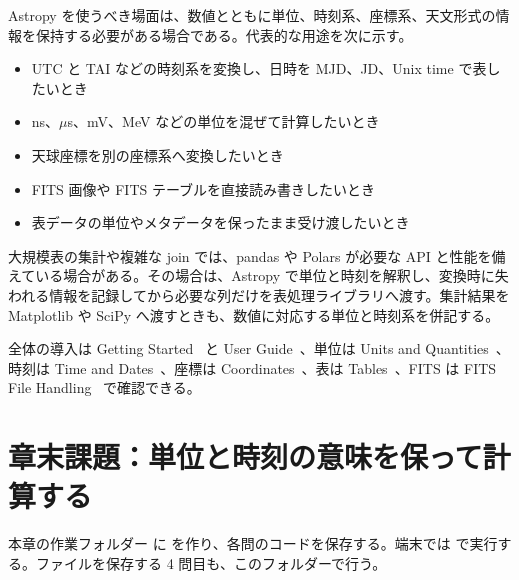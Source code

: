 Astropy を使うべき場面は、数値とともに単位、時刻系、座標系、天文形式の情報を保持する必要がある場合である。代表的な用途を次に示す。

\begin{itemize}
\item UTC と TAI などの時刻系を変換し、日時を MJD、JD、Unix time で表したいとき
\item ns、\(\mu\)s、mV、MeV などの単位を混ぜて計算したいとき
\item 天球座標を別の座標系へ変換したいとき
\item FITS 画像や FITS テーブルを直接読み書きしたいとき
\item 表データの単位やメタデータを保ったまま受け渡したいとき
\end{itemize}

大規模表の集計や複雑な join では、pandas や Polars が必要な API と性能を備えている場合がある。その場合は、Astropy で単位と時刻を解釈し、変換時に失われる情報を記録してから必要な列だけを表処理ライブラリへ渡す。集計結果を Matplotlib や SciPy へ渡すときも、数値に対応する単位と時刻系を併記する。

全体の導入は Getting Started~\cite{astropy_getting_started} と User Guide~\cite{astropy_user_guide}、単位は Units and Quantities~\cite{astropy_units}、時刻は Time and Dates~\cite{astropy_time}、座標は Coordinates~\cite{astropy_coordinates}、表は Tables~\cite{astropy_table}、FITS は FITS File Handling~\cite{astropy_fits} で確認できる。

\section{章末課題：単位と時刻の意味を保って計算する}

本章の作業フォルダー  に  を作り、各問のコードを保存する。端末では  で実行する。ファイルを保存する 4 問目も、このフォルダーで行う。

